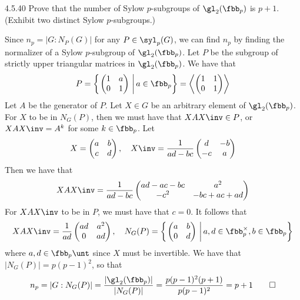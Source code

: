 \begin{exercise}{4.5.40}
	Prove that the number of Sylow $p$-subgroups of $\gl_2(\fbb_p)$ is $p + 1$. (Exhibit two distinct Sylow $p$-subgroups.)
\end{exercise}

\begin{sol}
	Since $n_p = |G : N_P(G)|$ for any $P \in \syl_p(G)$, we can find $n_p$ by finding the normalizer of a Sylow $p$-subgroup of $\gl_2(\fbb_p)$.
	Let $P$ be the subgroup of strictly upper triangular matrices in $\gl_2(\fbb_p)$.
	We have that
	\[
		P = 
		\left\{\left.
			\begin{pmatrix}
				1 & a \\
				0 & 1
			\end{pmatrix}~\right| a \in \fbb_p
		\right\}
		= 
		\left\langle
			\begin{pmatrix}
				1 & 1 \\
				0 & 1
			\end{pmatrix}
		\right\rangle
	\]
	Let $A$ be the generator of $P$.
	Let $X \in G$ be an arbitrary element of $\gl_2(\fbb_p)$.
	For $X$ to be in $N_G(P)$, then we must have that $XAX\inv \in P$, or $XAX\inv = A^k$ for some $k \in \fbb_p$.
	Let
	\[
		X =
		\begin{pmatrix}
			a & b \\
			c & d
		\end{pmatrix}, \quad
		X\inv =
		\frac{1}{ad - bc}
		\begin{pmatrix}
			d & -b \\
			-c & a
		\end{pmatrix}
	\]
	Then we have that
	\[
		XAX\inv =
		\frac{1}{ad - bc}
		\begin{pmatrix}
			ad - ac - bc & a^2 \\
			-c^2 & -bc + ac + ad
		\end{pmatrix}
	\]
	For $XAX\inv$ to be in $P$, we must have that $c = 0$.
	It follows that
	\[
		XAX\inv = 
		\frac{1}{ad}
		\begin{pmatrix}
			ad & a^2 \\
			0 & ad
		\end{pmatrix}, \quad
		N_G(P) = 
		\left\{\left.
			\begin{pmatrix}
				a & b \\
				0 & d
			\end{pmatrix}~\right| a, d \in \fbb_p^\times, b \in \fbb_p
		\right\}
	\]
	where $a, d \in \fbb_p\unt$ since $X$ must be invertible.
	We have that $|N_G(P)| = p(p - 1)^2$, so that
	\[
		n_p = |G : N_G(P)| = \frac{|\gl_2(\fbb_p)|}{|N_G(P)|} = \frac{p(p - 1)^2(p + 1)}{p(p - 1)^2} = p + 1 \qedhere
	\]
\end{sol}

